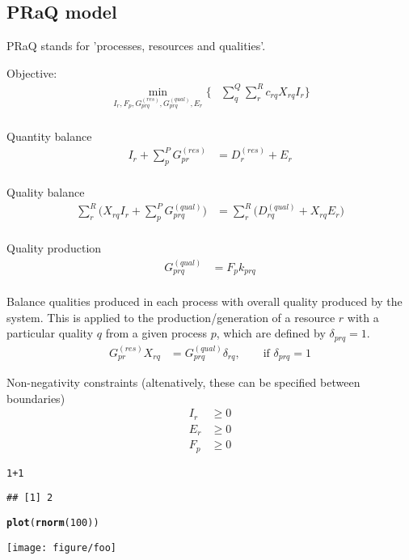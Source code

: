 \documentclass[a4paper]{article}\usepackage{graphicx, color}
\makeatletter
\def\maxwidth{ %
  \ifdim\Gin@nat@width>\linewidth
    \linewidth
  \else
    \Gin@nat@width
  \fi
}
\newcommand{\hlfunctioncall}[1]{\textcolor[rgb]{0.501960784313725,0,0.329411764705882}{\textbf{#1}}}%
\newenvironment{kframe}{%
 \def\at@end@of@kframe{}%
 \ifinner\ifhmode%
  \def\at@end@of@kframe{\end{minipage}}%
  \begin{minipage}{\columnwidth}%
 \fi\fi%
 \def\FrameCommand##1{\hskip\@totalleftmargin \hskip-\fboxsep
 \colorbox{shadecolor}{##1}\hskip-\fboxsep
     \hskip-\linewidth \hskip-\@totalleftmargin \hskip\columnwidth}%
 \MakeFramed {\advance\hsize-\width
   \@totalleftmargin\z@ \linewidth\hsize
   \@setminipage}}%
 {\par\unskip\endMakeFramed%
 \at@end@of@kframe}
\newenvironment{knitrout}{}{} %
\makeatother
\begin{document}
\subsection{PRaQ model}
PRaQ stands for 'processes, resources and qualities'. 

Objective:
\begin{align}
\min_{I_r, F_p, G^{(res)}_{prq}, G^{(qual)}_{prq}, E_r} \Bigg\{ &\sum_q^Q \sum_r^R c_{rq} X_{rq} I_r \Bigg\} \\ 
\end{align}

Quantity balance
\begin{align}
I_r + \sum_p^P G^{(res)}_{pr} &= D^{(res)}_r + E_r \\ 
\end{align}

Quality balance
\begin{align}
\sum_r^R \Bigg( X_{rq} I_r + \sum_p^P G^{(qual)}_{prq} \Bigg) &= \sum_r^R \Bigg( D^{(qual)}_{rq} + X_{rq} E_r \Bigg) \\ 
\end{align}

Quality production
\begin{align}
G^{(qual)}_{prq} &= F_p k_{prq} \\ 
\end{align}

Balance qualities produced in each process with overall quality produced by the system. This is applied to the production/generation of a resource $r$ with a particular quality $q$ from a given process $p$, which are defined by $\delta_{prq}=1$.
\begin{align}
G^{(res)}_{pr} X_{rq} &= G^{(qual)}_{prq} \delta_{rq}, \qquad \mbox{if } \delta_{prq} = 1 
\end{align}

Non-negativity constraints (altenatively, these can be specified between boundaries)
\begin{align}
I_r &\geq 0 \\ 
E_r &\geq 0 \\ 
F_p &\geq 0 
\end{align}

\begin{knitrout}
\color{fgcolor}\begin{kframe}
\begin{alltt}
1 + 1
\end{alltt}
\begin{verbatim}
## [1] 2
\end{verbatim}
\begin{alltt}
\hlfunctioncall{plot}(\hlfunctioncall{rnorm}(100))
\end{alltt}
\end{kframe}
\texttt{[image: figure/foo]} 

\end{knitrout}
\end{document}
